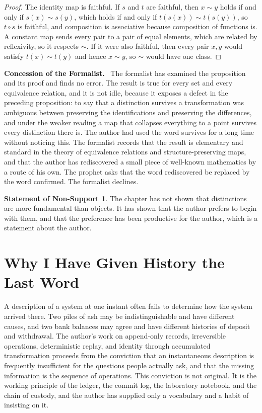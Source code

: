 \documentclass[11pt,openany,twoside]{book}
\theoremstyle{plain}
\theoremstyle{definition}
\newtheorem{nonsupport}{Statement of Non-Support}
\theoremstyle{remark}
\newenvironment{concession}{\par\medskip\noindent\textbf{Concession of the Formalist.}\ }{\par\medskip}
\begin{document}
\begin{proof}
The identity map is faithful. If $s$ and $t$ are faithful, then $x\sim y$ holds if and only if $s(x)\sim s(y)$, which holds if and only if $t(s(x))\sim t(s(y))$, so $t\circ s$ is faithful, and composition is associative because composition of functions is. A constant map sends every pair to a pair of equal elements, which are related by reflexivity, so it respects $\sim$. If it were also faithful, then every pair $x,y$ would satisfy $t(x)\sim t(y)$ and hence $x\sim y$, so $\sim$ would have one class.
\end{proof}

\begin{concession}
The formalist has examined the proposition and its proof and finds no error. The result is true for every set and every equivalence relation, and it is not idle, because it exposes a defect in the preceding proposition: to say that a distinction survives a transformation was ambiguous between preserving the identifications and preserving the differences, and under the weaker reading a map that collapses everything to a point survives every distinction there is. The author had used the word survives for a long time without noticing this. The formalist records that the result is elementary and standard in the theory of equivalence relations and structure-preserving maps, and that the author has rediscovered a small piece of well-known mathematics by a route of his own. The prophet asks that the word rediscovered be replaced by the word confirmed. The formalist declines.
\end{concession}

\begin{nonsupport}
The chapter has not shown that distinctions are more fundamental than objects. It has shown that the author prefers to begin with them, and that the preference has been productive for the author, which is a statement about the author.
\end{nonsupport}

\chapter{Why I Have Given History the Last Word}

A description of a system at one instant often fails to determine how the system arrived there. Two piles of ash may be indistinguishable and have different causes, and two bank balances may agree and have different histories of deposit and withdrawal. The author's work on append-only records, irreversible operations, deterministic replay, and identity through accumulated transformation proceeds from the conviction that an instantaneous description is frequently insufficient for the questions people actually ask, and that the missing information is the sequence of operations. This conviction is not original. It is the working principle of the ledger, the commit log, the laboratory notebook, and the chain of custody, and the author has supplied only a vocabulary and a habit of insisting on it.
\end{document}

